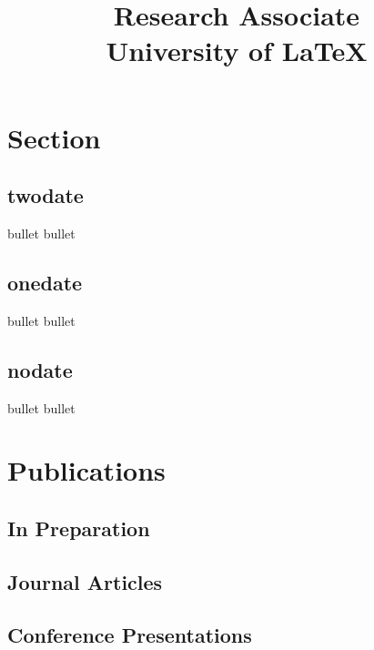 \documentclass[datewid=4em,margin=4cm]{nacv}
\title{Research Associate\\University of \LaTeX}
\begin{document}
  \maketitle
  \section{Section}
  \subsection{twodate}\twodate
  \bullet bullet
  \bullet bullet
  \subsection{onedate}\onedate
  \bullet bullet
  \bullet bullet
  \subsection{nodate}\nodate
  \bullet bullet
  \bullet bullet
  \section{Publications}
  \nocite{*}
  \subsection{In Preparation}
  \subsection{Journal Articles}
  \subsection{Conference Presentations}
\end{document}
